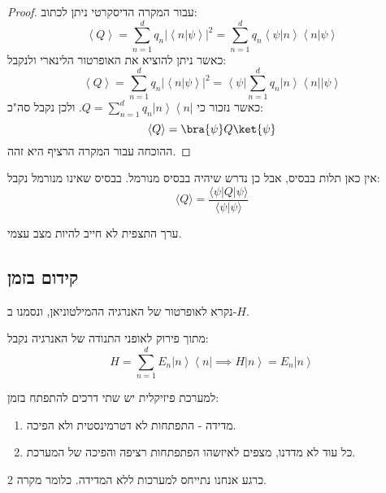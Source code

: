 \documentclass{tstextbook}
\begin{document}
\begin{proof}
עבור המקרה הדיסקרטי ניתן לכתוב:
$$\left\langle Q\right\rangle={\sum_{n=1}^{d}}q_{n}\left|\left\langle n|\psi\right\rangle\right|^{2}={\sum_{n=1}^{d}}q_{n}\left\langle\psi|n\right\rangle\left\langle n|\psi\right\rangle$$
כאשר ניתן להוציא את האופרטור הלינארי ולנקבל:
$$\left\langle Q\right\rangle={\sum_{n=1}^{d}}q_{n}\left|\left\langle n|\psi\right\rangle\right|^{2}=\left\langle\psi\right|{\sum_{n=1}^{d}}q_{n}\left|n\right\rangle\left\langle n\right|\left|\psi\right\rangle$$
כאשר נזכור כי \(Q=\sum_{n=1}^{d}q_{n}\left|n\right\rangle\left\langle n\right|\). ולכן נקבל סה"כ:
$$\langle Q \rangle =\bra{\psi} Q\ket{\psi}  $$
ההוכחה עבור המקרה הרציף היא זהה.

\end{proof}
\begin{remark}
אין כאן תלות בבסיס, אבל כן נדרש שיהיה בבסיס מנורמל. בבסיס שאינו מנורמל נקבל:
$$\langle Q\rangle =\frac{\langle \psi |Q  |\psi \rangle }{\langle\psi|\psi\rangle}$$

\end{remark}
\begin{remark}
ערך התצפית לא חייב להיות מצב עצמי.

\end{remark}
\subsection{קידום בזמן}

\begin{definition}[המילטוניאן]
נקרא לאופרטור של האנרגיה ההמילטוניאן, ונסמנו ב-\(H\).

\end{definition}
\begin{proposition}
מתוך פירוק לאופני התנודה של האנרגיה נקבל:
$$H=\sum_{n=1}^{d}\!E_{n}\left|n\right\rangle\left\langle n\right|\implies H\left|n\right\rangle=E_{n}\left|n\right\rangle$$

\end{proposition}
\begin{proposition}
למערכת פיזיקלית יש שתי דרכים להתפתח בזמן:

  \begin{enumerate}
    \item מדידה - התפתחות לא דטרמינסטית ולא הפיכה. 


    \item כל עוד לא מדדנו, מצפים לאיזשהו הפתפתחות רציפה והפיכה של המערכת. 


  \end{enumerate}
\end{proposition}
כרגע אנחנו נתייחס למערכות ללא המדידה. כלומר מקרה 2.
\end{document}
